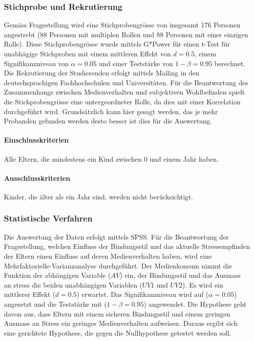 \subsubsection{Stichprobe und Rekrutierung}
Gemäss Fragestellung wird eine Stichprobengrösse von insgesamt 176 Personen angestrebt (88 Personen mit multiplen Rollen und 88 Personen mit einer einzigen Rolle). Diese Stichprobengrösse wurde mittels G*Power für einen t-Test für unabhägige Stichproben mit einem mittleren Effekt von $d = 0.5$, einem Signifikanzniveau von $\alpha=0.05$ und einer Teststärke von $1-\beta=0.95$ berechnet. Die Rekrutierung der Studierenden erfolgt mittels Mailing in den deutschsprachigen Fachhochschulen und Universitäten.
Für die Beantwortung des Zusammenhangs zwischen Medienverhalten und subjektiven Wohlbefinden spielt die Stichprobengrösse eine untergeordneter Rolle, da dies mit einer Korrelation durchgeführt wird. Grundsätzlich kann hier gesagt werden, das je mehr Probanden gefunden werden desto besser ist dies für die Auswertung. 
\paragraph{Einschlusskriterien}
Alle Eltern, die mindestens ein Kind zwischen 0 und einem Jahr haben.
\paragraph{Ausschlusskriterien}
Kinder, die älter als ein Jahr sind, werden nicht berücksichtigt.
\subsubsection{Statistische Verfahren}
Die Auswertung der Daten erfolgt mittels SPSS. 
Für die Beantwortung der Fragestellung, welchen Einfluss der Bindungsstil und das aktuelle Stressempfinden der Eltern einen Einfluss auf deren Medienverhalten haben, wird eine Mehrfaktorielle-Varianzanalyse durchgeführt. Der Medienkonsum nimmt die Funktion der abhängigen Variable ($AV$) ein, der Bindungsstil und das Ausmass an stress die beiden unabhängigen Variablen ($UV1$ und $UV2$). Es wird ein mittlerer Effekt ($d=0.5$) erwartet. Das Signifikanzniveau wird auf ($\alpha=0.05$) angesetzt und die Teststärke mit ($1-\beta=0.95$) angewendet.
Die Hypothese geht davon aus, dass Eltern mit einem sicheren Bindungsstil und einem geringen Ausmass an Stress ein geringes Medienverhalten aufweisen. Daraus ergibt sich eine gerichtete Hypothese, die gegen die Nullhypothese getestet werden soll.

